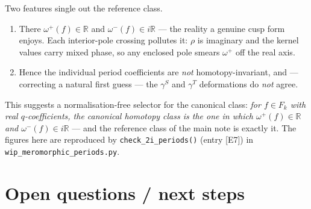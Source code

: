 \documentclass[11pt]{article}
\begin{document}
Two features single out the reference class.
\begin{enumerate}\itemsep0.2em
\item There $\omega^+(f)\in\mathbb{R}$ and $\omega^-(f)\in i\mathbb{R}$
  --- the reality a genuine cusp form enjoys. Each interior-pole
  crossing pollutes it: $\rho$ is imaginary and the kernel values carry
  mixed phase, so any enclosed pole smears $\omega^+$ off the real
  axis.
\item Hence the individual period coefficients are \emph{not}
  homotopy-invariant, and --- correcting a natural first guess --- the
  $\gamma^S$ and $\gamma^T$ deformations do \emph{not} agree.
\end{enumerate}
This suggests a normalisation-free selector for the canonical class:
\emph{for $f\in F_k$ with real $q$-coefficients, the canonical homotopy
class is the one in which $\omega^+(f)\in\mathbb{R}$ and $\omega^-(f)\in
i\mathbb{R}$} --- and the reference class of the main note is exactly
it. The figures here are reproduced by \texttt{check\_2i\_periods()}
(entry [E7]) in \texttt{wip\_meromorphic\_periods.py}.

\section{Open questions / next steps}
\end{document}
